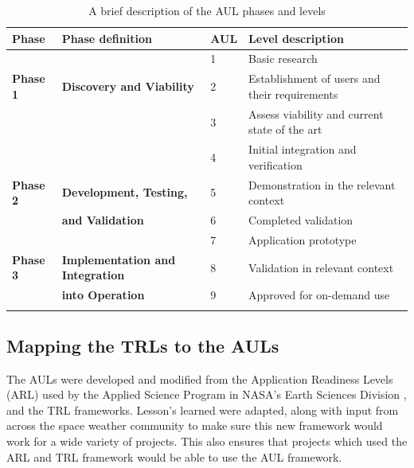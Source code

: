 \documentclass[referee,a4paper,12pt,traditabstract]{swsc}
\begin{document}
\begin{linenumbers}
\begin{table}
\caption{A brief description of the AUL phases and levels}
\centering
\begin{tabular}{llll}\hline
Phase & Phase definition & AUL & Level description \\
 \hline
 & & \textcolor{CASIIaliceblue}{1}& \textcolor{CASIIaliceblue}{Basic research}\\
 \textcolor{CASIIaliceblue}{{\bf Phase 1} }& \textcolor{CASIIaliceblue}{{\bf Discovery and Viability }} & \textcolor{CASIIaliceblue}{2} & \textcolor{CASIIaliceblue}{Establishment of users and their requirements}\\ 
& & \textcolor{CASIIaliceblue}{3} &\textcolor{CASIIaliceblue}{Assess viability and current state of the art} \\
 \hline
 \hline
 & & \textcolor{CASIIdarkgreen}{4}& \textcolor{CASIIdarkgreen}{Initial integration and verification}\\
 \textcolor{CASIIdarkgreen}{{\bf Phase 2} }& \textcolor{CASIIdarkgreen}{{\bf Development, Testing,  }} & \textcolor{CASIIdarkgreen}{5} & \textcolor{CASIIdarkgreen}{Demonstration in the relevant context}\\ 
& \textcolor{CASIIdarkgreen}{{\bf and Validation}}& \textcolor{CASIIdarkgreen}{6} &\textcolor{CASIIdarkgreen}{Completed validation} \\
 \hline 
 \hline
 & & \textcolor{CASIIdarkyellow}{{7}}& \textcolor{CASIIdarkyellow}{{Application prototype}}\\
 \textcolor{CASIIdarkyellow}{{{\bf Phase 3}}}& \textcolor{CASIIdarkyellow}{{{\bf Implementation and Integration}}} & \textcolor{CASIIdarkyellow}{{8}} & \textcolor{CASIIdarkyellow}{{Validation in relevant context}}\\ 
& \textcolor{CASIIdarkyellow}{{{\bf into Operation}}} & \textcolor{CASIIdarkyellow}{{9}} &\textcolor{CASIIdarkyellow}{{Approved for on-demand use}} \\


\label{Tab_AUL}
\end{tabular}
\end{table}


\subsection{Mapping the TRLs to the AULs}
The AULs were developed and modified from the Application Readiness Levels (ARL) used by the Applied Science Program in NASA's Earth Sciences Division \cite[see Figure 1, or https://www.nasa.gov/sites/default/files/files/ExpandedARLDefinitions4813.pdf]{Pulkkinen2017}, and the TRL frameworks. Lesson's learned were adapted, along with input from across the space weather community to make sure this new framework would work for a wide variety of projects. This also ensures that projects which used the ARL and TRL framework would be able to use the AUL framework. 


\end{linenumbers}
\end{document}
